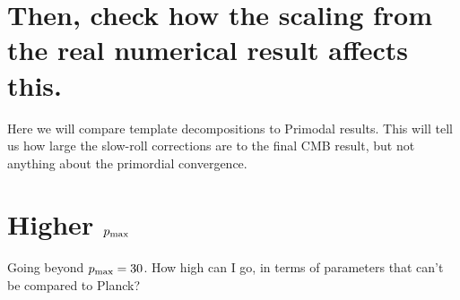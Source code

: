 \section{Then, check how the scaling from the real numerical result affects this.}
    Here we will compare template decompositions to Primodal results.
    This will tell us how large the slow-roll corrections are to the
    final CMB result, but not anything about the primordial convergence.
\section{Higher $p_\text{max}$}
    Going beyond $p_\text{max}=30$.
    How high can I go, in terms of parameters that can't be compared to Planck?
